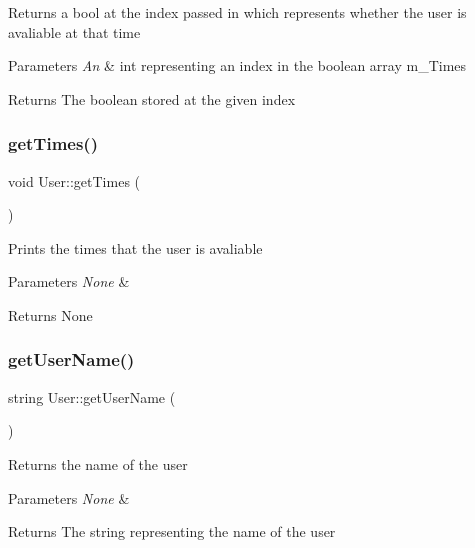 Returns a bool at the index passed in which represents whether the user is avaliable at that time 
\begin{DoxyParams}{Parameters}
{\em An} & int representing an index in the boolean array m\+\_\+\+Times \\
\hline
\end{DoxyParams}
\begin{DoxyReturn}{Returns}
The boolean stored at the given index 
\end{DoxyReturn}
\mbox{\label{class_user_a70486059b5ee29b656c8331583cdd5b5}} 
\subsubsection{\texorpdfstring{get\+Times()}{getTimes()}}
{\footnotesize\ttfamily void User\+::get\+Times (\begin{DoxyParamCaption}{ }\end{DoxyParamCaption})}

Prints the times that the user is avaliable 
\begin{DoxyParams}{Parameters}
{\em None} & \\
\hline
\end{DoxyParams}
\begin{DoxyReturn}{Returns}
None 
\end{DoxyReturn}
\mbox{\label{class_user_a3fcf5814ba0a2415862c892746585a46}} 
\subsubsection{\texorpdfstring{get\+User\+Name()}{getUserName()}}
{\footnotesize\ttfamily string User\+::get\+User\+Name (\begin{DoxyParamCaption}{ }\end{DoxyParamCaption})}

Returns the name of the user 
\begin{DoxyParams}{Parameters}
{\em None} & \\
\hline
\end{DoxyParams}
\begin{DoxyReturn}{Returns}
The string representing the name of the user 
\end{DoxyReturn}
\mbox{\label{class_user_a93c208c3a71df99ca19a1782f6d32c34}} 
